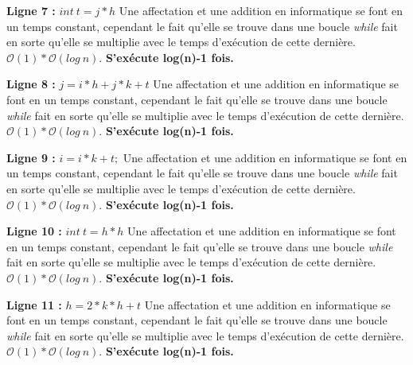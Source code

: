 \documentclass[12pt]{article}
\begin{document}
        \noindent \textbf{Ligne 7 :} \( int \: t = j*h \) \newline
        Une affectation et une addition en informatique se font en un temps constant, cependant le fait qu'elle se trouve dans une boucle \textit{while} fait en sorte qu'elle se multiplie avec le temps d'exécution de cette dernière.
        \( \mathcal{O}(1)*\mathcal{O}(log \: n) \). \newline
		\textbf{S'exécute log(n)-1 fois.} \newline

        \noindent \textbf{Ligne 8 :} \( j = i*h + j*k + t \) \newline
  	    Une affectation et une addition en informatique se font en un temps constant, cependant le fait qu'elle se trouve dans une boucle \textit{while} fait en sorte qu'elle se multiplie avec le temps d'exécution de cette dernière.
        \( \mathcal{O}(1)*\mathcal{O}(log \: n) \). \newline
 		\textbf{S'exécute log(n)-1 fois.} \newline

        \noindent \textbf{Ligne 9 :} \( i = i*k + t; \) \newline
  	    Une affectation et une addition en informatique se font en un temps constant, cependant le fait qu'elle se trouve dans une boucle \textit{while} fait en sorte qu'elle se multiplie avec le temps d'exécution de cette dernière.
        \( \mathcal{O}(1)*\mathcal{O}(log \: n) \). \newline
		\textbf{S'exécute log(n)-1 fois.} \newline

        \noindent \textbf{Ligne 10 :} \( int \: t = h*h \) \newline
  	    Une affectation et une addition en informatique se font en un temps constant, cependant le fait qu'elle se trouve dans une boucle \textit{while} fait en sorte qu'elle se multiplie avec le temps d'exécution de cette dernière.
        \( \mathcal{O}(1)*\mathcal{O}(log \: n) \). \newline
        \textbf{S'exécute log(n)-1 fois.} \newline

        \noindent \textbf{Ligne 11 :} \( h = 2*k*h + t \) \newline
  	    Une affectation et une addition en informatique se font en un temps constant, cependant le fait qu'elle se trouve dans une boucle \textit{while} fait en sorte qu'elle se multiplie avec le temps d'exécution de cette dernière.
        \( \mathcal{O}(1)*\mathcal{O}(log \: n) \). \newline
        \textbf{S'exécute log(n)-1 fois.} \newline
\end{document}
